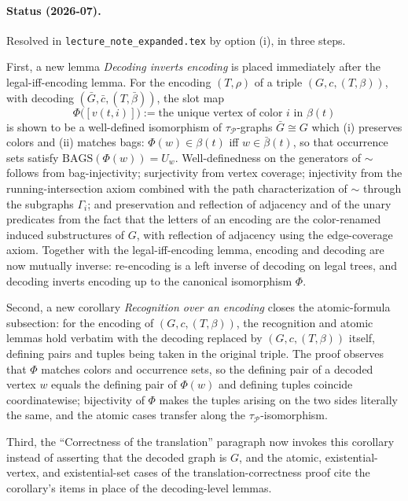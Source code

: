 \documentclass[11pt]{article}
\newcommand{\Bags}{\ensuremath{\mathrm{BAGS}}}
\begin{document}
\paragraph{Status (2026-07).} Resolved in \texttt{lecture\_note\_expanded.tex}
by option (i), in three steps.

First, a new lemma \emph{Decoding inverts encoding} is placed immediately
after the legal-iff-encoding lemma.  For the encoding \((T,\rho)\) of a triple
\((G,c,(T,\beta))\), with decoding \((\bar G,\bar c,(T,\bar\beta))\), the slot
map
\[
  \Phi\bigl([v(t,i)]\bigr) := \text{the unique vertex of color \(i\) in
  \(\beta(t)\)}
\]
is shown to be a well-defined isomorphism of
\(\tau_{\mathcal P}\)-graphs \(\bar G\cong G\) which (i) preserves colors and
(ii) matches bags: \(\Phi(w)\in\beta(t)\) iff \(w\in\bar\beta(t)\), so that
occurrence sets satisfy \(\Bags(\Phi(w))=U_w\).  Well-definedness on the
generators of \(\sim\) follows from bag-injectivity; surjectivity from vertex
coverage; injectivity from the running-intersection axiom combined with the
path characterization of \(\sim\) through the subgraphs \(\Gamma_i\); and
preservation and reflection of adjacency and of the unary predicates from the
fact that the letters of an encoding are the color-renamed induced
substructures of \(G\), with reflection of adjacency using the edge-coverage
axiom.  Together with the legal-iff-encoding lemma, encoding and decoding are
now mutually inverse: re-encoding is a left inverse of decoding on legal
trees, and decoding inverts encoding up to the canonical isomorphism
\(\Phi\).

Second, a new corollary \emph{Recognition over an encoding} closes the
atomic-formula subsection: for the encoding of \((G,c,(T,\beta))\), the
recognition and atomic lemmas hold verbatim with the decoding replaced by
\((G,c,(T,\beta))\) itself, defining pairs and tuples being taken in the
original triple.  The proof observes that \(\Phi\) matches colors and
occurrence sets, so the defining pair of a decoded vertex \(w\) equals the
defining pair of \(\Phi(w)\) and defining tuples coincide coordinatewise;
bijectivity of \(\Phi\) makes the tuples arising on the two sides literally
the same, and the atomic cases transfer along the
\(\tau_{\mathcal P}\)-isomorphism.

Third, the ``Correctness of the translation'' paragraph now invokes this
corollary instead of asserting that the decoded graph is \(G\), and the
atomic, existential-vertex, and existential-set cases of the
translation-correctness proof cite the corollary's items in place of the
decoding-level lemmas.
\end{document}
